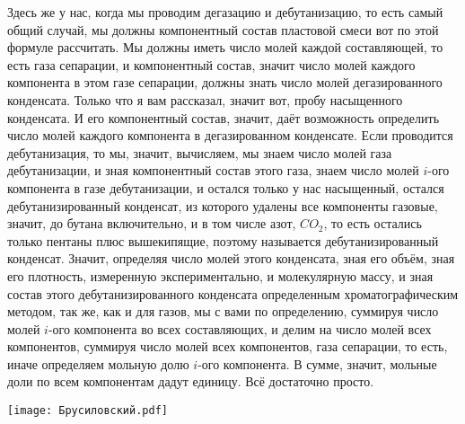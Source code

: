 \documentclass[main.tex]{subfiles}
\begin{document}
Здесь же у нас, когда мы проводим дегазацию и дебутанизацию, то есть самый общий случай, мы должны компонентный состав пластовой смеси вот по этой формуле рассчитать.
Мы должны иметь число молей каждой составляющей, то есть газа сепарации, и компонентный состав, значит число молей каждого компонента в этом газе сепарации, должны знать число молей дегазированного конденсата.
Только что я вам рассказал, значит вот, пробу насыщенного конденсата.
И его компонентный состав, значит, даёт возможность определить число молей каждого компонента в дегазированном конденсате.
Если проводится дебутанизация, то мы, значит, вычисляем, мы знаем число молей газа дебутанизации, и зная компонентный состав этого газа, знаем число молей $i$-ого компонента в газе дебутанизации, и остался только у нас насыщенный, остался дебутанизированный конденсат, из которого удалены все компоненты газовые, значит, до бутана включительно, и в том числе азот, $CO_2$, то есть остались только пентаны плюс вышекипящие, поэтому называется дебутанизированный конденсат.
Значит, определяя число молей этого конденсата, зная его объём, зная его плотность, измеренную экспериментально, и молекулярную массу, и зная состав этого дебутанизированного конденсата определенным хроматографическим методом, так же, как и для газов, мы с вами по определению, суммируя число молей $i$-ого компонента во всех составляющих, и делим на число молей всех компонентов, суммируя число молей всех компонентов, газа сепарации, то есть, иначе определяем мольную долю $i$-ого компонента.
В сумме, значит, мольные доли по всем компонентам дадут единицу.
Всё достаточно просто.

\begin{center}
\texttt{[image: Брусиловский.pdf]}
\end{center}
\end{document}
